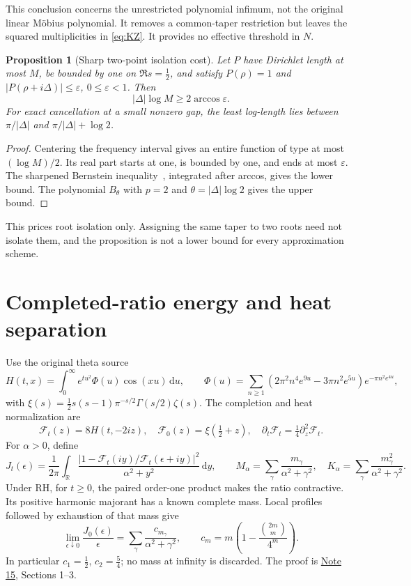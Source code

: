 \documentclass[11pt]{article}
\newtheorem{proposition}[theorem]{Proposition}
\newcommand{\dd}{\,\mathrm d}
\newcommand{\Href}{\href{../notes/15_COMPLETED_RATIO_ENERGY_AND_MULTIPLICITY_20261020.md}{Note 15}}
\begin{document}
This conclusion concerns the unrestricted polynomial infimum, not
the original linear M\"obius polynomial. It removes a common-taper
restriction but leaves the squared multiplicities in \eqref{eq:KZ}.
It provides no effective threshold in \(N\).

\begin{proposition}[Sharp two-point isolation cost]\label{prop:filter}
Let \(P\) have Dirichlet length at most \(M\), be bounded by one on
\(\Re s=\frac12\), and satisfy \(P(\rho)=1\) and
\(|P(\rho+i\Delta)|\le\varepsilon\), \(0\le\varepsilon<1\).
Then
\[
 |\Delta|\log M\ge2\arccos\varepsilon.
\]
For exact cancellation at a small nonzero gap, the least log-length
lies between \(\pi/|\Delta|\) and \(\pi/|\Delta|+\log2\).
\end{proposition}
\begin{proof}
Centering the frequency interval gives an entire function of type
at most \((\log M)/2\). Its real part starts at one, is bounded by one,
and ends at most \(\varepsilon\).
The sharpened Bernstein inequality~\cite{Redheffer}, integrated after
arccos, gives the lower bound. The polynomial \(B_\theta\) with
\(p=2\) and \(\theta=|\Delta|\log2\) gives the upper bound.
\end{proof}
This prices root isolation only. Assigning the same taper to two
roots need not isolate them, and the proposition is not a lower
bound for every approximation scheme.

\section{Completed-ratio energy and heat separation}
Use the original theta source
\[
 H(t,x)=\int_0^\infty e^{tu^2}\Phi(u)\cos(xu)\dd u,\qquad
 \Phi(u)=\sum_{n\ge1}(2\pi^2n^4e^{9u}-3\pi n^2e^{5u})
                                      e^{-\pi n^2e^{4u}},
\]
with \(\xi(s)=\tfrac12s(s-1)\pi^{-s/2}\Gamma(s/2)\zeta(s)\).
The completion and heat normalization are
\[
 \mathcal F_t(z)=8H(t,-2iz),\quad \mathcal F_0(z)=\xi(\tfrac12+z),\quad
 \partial_t\mathcal F_t=\tfrac14\partial_z^2\mathcal F_t.
\]
For \(\alpha>0\), define
\[
 J_t(\epsilon)=\frac1{2\pi}\int_{\mathbb R}
 \frac{|1-\mathcal F_t(iy)/\mathcal F_t(\epsilon+iy)|^2}
      {\alpha^2+y^2}\dd y,\qquad
 M_\alpha=\sum_\gamma\frac{m_\gamma}{\alpha^2+\gamma^2},\quad
 K_\alpha=\sum_\gamma\frac{m_\gamma^2}{\alpha^2+\gamma^2}.
\]
Under RH, for \(t\ge0\), the paired order-one product makes the ratio contractive.
Its positive harmonic majorant has a known complete mass.
Local profiles followed by exhaustion of that mass give
\begin{equation}\label{eq:ratio}
 \lim_{\epsilon\downarrow0}\frac{J_0(\epsilon)}{\epsilon}
    =\sum_\gamma\frac{c_{m_\gamma}}{\alpha^2+\gamma^2},
 \qquad c_m=m\left(1-\frac{\binom{2m}{m}}{4^m}\right).
\end{equation}
In particular \(c_1=\frac12\), \(c_2=\frac54\); no mass at infinity
is discarded. The proof is \Href, Sections 1--3.
\end{document}
